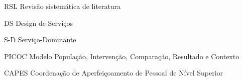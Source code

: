 \begin{siglas}
  \item[RSL] Revisão sistemática de literatura
  \item[DS] Design de Serviços
  \item[S-D] Serviço-Dominante
  \item[PICOC] Modelo População, Intervenção, Comparação, Resultado e Contexto
  \item[CAPES] Coordenação de Aperfeiçoamento de Pessoal de Nível Superior

\end{siglas}
